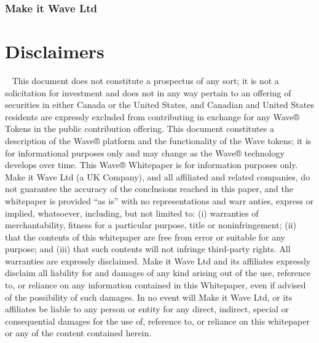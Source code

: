 \documentclass[letterpaper,10pt,openany,oneside,english]{sphinxmanual}
\begin{document}
\subsubsection{Make it Wave Ltd}
\label{\detokenize{index:make-it-wave-ltd}}

\section{Disclaimers}
\label{\detokenize{index:disclaimers}}
  This document does not constitute a prospectus of any sort; it is not a solicitation for investment and does not in any way pertain to an offering of securities in either Canada or the United States, and Canadian and United States residents are expressly excluded from contributing in exchange for any Wave® Tokens in the public contribution offering. This document constitutes a description of the Wave® platform and the functionality of the Wave tokens; it is for informational purposes only and may change as the Wave® technology develops over time. This Wave® Whitepaper is for information purposes only. Make it Wave Ltd (a UK Company), and all affiliated and related companies, do not guarantee the accuracy of the conclusions reached in this paper, and the whitepaper is provided “as is” with no representations and warr anties, express or implied, whatsoever, including, but not limited to: (i) warranties of merchantability, fitness for a particular purpose, title or noninfringement; (ii) that the contents of this whitepaper are free from error or suitable for any purpose; and (iii) that such contents will not infringe third-party rights. All warranties are expressly disclaimed. Make it Wave Ltd and its affiliates expressly disclaim all liability for and damages of any kind arising out of the use, reference to, or reliance on any information contained in this Whitepaper, even if advised of the possibility of such damages. In no event will Make it Wave Ltd, or its affiliates be liable to any person or entity for any direct, indirect, special or consequential damages for the use of, reference to, or reliance on this whitepaper or any of the content contained herein.
\end{document}
